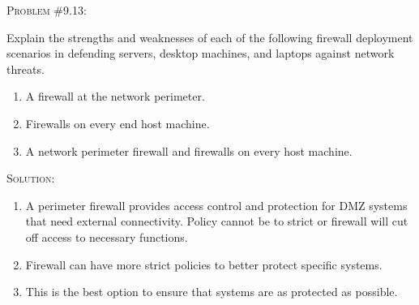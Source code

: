\documentclass[12pt]{article}
\newenvironment{problem}[1]
{\begin{mdframed}[linewidth=0.8pt]
        \textsc{Problem #1:}

}
    {\end{mdframed}}
\newenvironment{solution}
    {\textsc{Solution:}\\}
    {\newpage}%
\begin{document}
	\begin{problem}{\#9.13}
		Explain the strengths and weaknesses of each of the following firewall deployment scenarios in defending servers, desktop machines, and laptops against network threats.
		\begin{enumerate}[label=\alph*]
			\item A firewall at the network perimeter.
			\item Firewalls on every end host machine.
			\item A network perimeter firewall and firewalls on every host machine.
		\end{enumerate}
	\end{problem}
	\begin{solution}
		\begin{enumerate}[label=\alph*]
			\item A perimeter firewall provides access control and protection for DMZ systems that need external connectivity. Policy cannot be to strict or firewall will cut off access to necessary functions.
			\item Firewall can have more strict policies to better protect specific systems.
			\item This is the best option to ensure that systems are as protected as possible.
		\end{enumerate}
	\end{solution}
\end{document}
